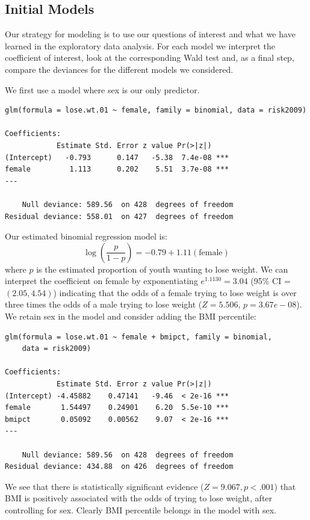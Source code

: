 \documentclass[
]{krantz}
\begin{document}
\hypertarget{initial-models-2}{%
\subsection{Initial Models}\label{initial-models-2}}

Our strategy for modeling is to use our questions of interest and what we have learned in the exploratory data analysis. For each model we interpret the coefficient of interest, look at the corresponding Wald test and, as a final step, compare the deviances for the different models we considered.

We first use a model where sex is our only predictor.

\begin{verbatim}
glm(formula = lose.wt.01 ~ female, family = binomial, data = risk2009)

Coefficients:
            Estimate Std. Error z value Pr(>|z|)    
(Intercept)   -0.793      0.147   -5.38  7.4e-08 ***
female         1.113      0.202    5.51  3.7e-08 ***
---

    Null deviance: 589.56  on 428  degrees of freedom
Residual deviance: 558.01  on 427  degrees of freedom
\end{verbatim}

Our estimated binomial regression model is:
\[\log\left(\frac{{p}}{1-{p}}\right)=-0.79+1.11 (\textrm{female})\]
where \({p}\) is the estimated proportion of youth wanting to lose weight. We can interpret the coefficient on female by exponentiating \(e^{1.1130} = 3.04\) (95\% CI = \((2.05, 4.54)\)) indicating that the odds of a female trying to lose weight is over three times the odds of a male trying to lose weight (\(Z=5.506\), \(p=3.67e-08\)). We retain sex in the model and consider adding the BMI percentile:

\begin{verbatim}
glm(formula = lose.wt.01 ~ female + bmipct, family = binomial, 
    data = risk2009)

Coefficients:
            Estimate Std. Error z value Pr(>|z|)    
(Intercept) -4.45882    0.47141   -9.46  < 2e-16 ***
female       1.54497    0.24901    6.20  5.5e-10 ***
bmipct       0.05092    0.00562    9.07  < 2e-16 ***
---

    Null deviance: 589.56  on 428  degrees of freedom
Residual deviance: 434.88  on 426  degrees of freedom
\end{verbatim}

We see that there is statistically significant evidence (\(Z=9.067, p<.001\)) that BMI is positively associated with the odds of trying to lose weight, after controlling for sex. Clearly BMI percentile belongs in the model with sex.
\end{document}
